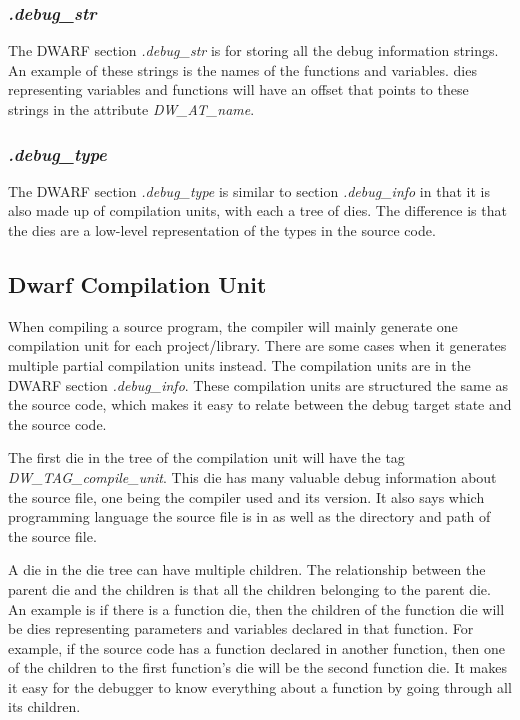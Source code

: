 \subsubsection{\emph{.debug\_str}}
The DWARF section \emph{.debug\_str} is for storing all the debug information strings.
An example of these strings is the names of the functions and variables.
\glspl{die} representing variables and functions will have an offset that points to these strings in the attribute \emph{DW\_AT\_name}. 


\subsubsection{\emph{.debug\_type}}
The \gls{DWARF} section \emph{.debug\_type} is similar to section \emph{.debug\_info} in that it is also made up of compilation units, with each a tree of \glspl{die}.
The difference is that the \glspl{die} are a low-level representation of the types in the source code.



\subsection{Dwarf Compilation Unit}
When compiling a source program, the compiler will mainly generate one compilation unit for each project/library.
There are some cases when it generates multiple partial compilation units instead.
The compilation units are in the \gls{DWARF} section \emph{.debug\_info}.
These compilation units are structured the same as the source code, which makes it easy to relate between the debug target state and the source code.


The first \gls{die} in the tree of the compilation unit will have the tag \emph{DW\_TAG\_compile\_unit}.
This \gls{die} has many valuable debug information about the source file, one being the compiler used and its version.
It also says which programming language the source file is in as well as the directory and path of the source file.


A \gls{die} in the \gls{die} tree can have multiple children.
The relationship between the parent \gls{die} and the children is that all the children belonging to the parent \gls{die}.
An example is if there is a function \gls{die}, then the children of the function \gls{die} will be \glspl{die} representing parameters and variables declared in that function.
For example, if the source code has a function declared in another function, then one of the children to the first function's \gls{die} will be the second function \gls{die}.
It makes it easy for the debugger to know everything about a function by going through all its children.


